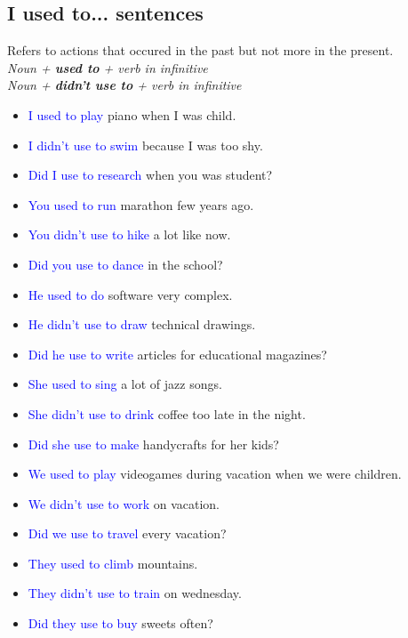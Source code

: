 \subsection{I used to... sentences}
\begin{multicols}{2}
Refers to actions that occured in the past but not more in the present.\\
\emph{Noun + \textbf{used to} + verb in infinitive}\\
\emph{Noun + \textbf{didn't use to} + verb in infinitive}\\

\begin{itemize}
\item \textcolor{blue}{I used to play} piano when I was child.
\item \textcolor{blue}{I didn't use to swim} because I was too shy.
\item \textcolor{blue}{Did I use to research} when you was student?
\item \textcolor{blue}{You used to run} marathon few years ago.
\item \textcolor{blue}{You didn't use to hike} a lot like now.
\item \textcolor{blue}{Did you use to dance} in the school?
\item \textcolor{blue}{He used to do} software very complex.
\item \textcolor{blue}{He didn't use to draw} technical drawings.
\item \textcolor{blue}{Did he use to write} articles for educational magazines?
\item \textcolor{blue}{She used to sing} a lot of jazz songs.
\item \textcolor{blue}{She didn't use to drink} coffee too late in the night.
\item \textcolor{blue}{Did she use to make} handycrafts for her kids?
\item \textcolor{blue}{We used to play} videogames during vacation when we were children.
\item \textcolor{blue}{We didn't use to work} on vacation.
\item \textcolor{blue}{Did we use to travel} every vacation?
\item \textcolor{blue}{They used to climb} mountains.
\item \textcolor{blue}{They didn't use to train} on wednesday.
\item \textcolor{blue}{Did they use to buy} sweets often?
\end{itemize}
\end{multicols}

